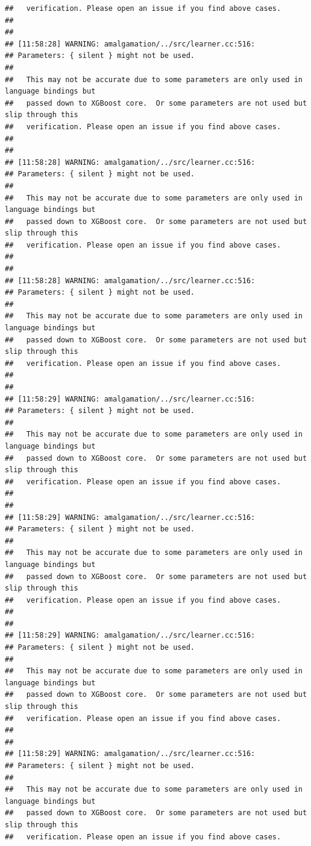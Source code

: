 \documentclass[AMS,STIX2COL]{WileyNJD-v2}\usepackage[]{graphicx}\usepackage[]{color}
\makeatletter
\newenvironment{kframe}{%
 \def\at@end@of@kframe{}%
 \ifinner\ifhmode%
  \def\at@end@of@kframe{\end{minipage}}%
  \begin{minipage}{\columnwidth}%
 \fi\fi%
 \def\FrameCommand##1{\hskip\@totalleftmargin \hskip-\fboxsep
 \colorbox{shadecolor}{##1}\hskip-\fboxsep
     \hskip-\linewidth \hskip-\@totalleftmargin \hskip\columnwidth}%
 \MakeFramed {\advance\hsize-\width
   \@totalleftmargin\z@ \linewidth\hsize
   \@setminipage}}%
 {\par\unskip\endMakeFramed%
 \at@end@of@kframe}
\newenvironment{knitrout}{}{} %
\makeatother
\begin{document}
\begin{knitrout}
\begin{kframe}
\begin{verbatim}
##   verification. Please open an issue if you find above cases.
## 
## 
## [11:58:28] WARNING: amalgamation/../src/learner.cc:516: 
## Parameters: { silent } might not be used.
## 
##   This may not be accurate due to some parameters are only used in language bindings but
##   passed down to XGBoost core.  Or some parameters are not used but slip through this
##   verification. Please open an issue if you find above cases.
## 
## 
## [11:58:28] WARNING: amalgamation/../src/learner.cc:516: 
## Parameters: { silent } might not be used.
## 
##   This may not be accurate due to some parameters are only used in language bindings but
##   passed down to XGBoost core.  Or some parameters are not used but slip through this
##   verification. Please open an issue if you find above cases.
## 
## 
## [11:58:28] WARNING: amalgamation/../src/learner.cc:516: 
## Parameters: { silent } might not be used.
## 
##   This may not be accurate due to some parameters are only used in language bindings but
##   passed down to XGBoost core.  Or some parameters are not used but slip through this
##   verification. Please open an issue if you find above cases.
## 
## 
## [11:58:29] WARNING: amalgamation/../src/learner.cc:516: 
## Parameters: { silent } might not be used.
## 
##   This may not be accurate due to some parameters are only used in language bindings but
##   passed down to XGBoost core.  Or some parameters are not used but slip through this
##   verification. Please open an issue if you find above cases.
## 
## 
## [11:58:29] WARNING: amalgamation/../src/learner.cc:516: 
## Parameters: { silent } might not be used.
## 
##   This may not be accurate due to some parameters are only used in language bindings but
##   passed down to XGBoost core.  Or some parameters are not used but slip through this
##   verification. Please open an issue if you find above cases.
## 
## 
## [11:58:29] WARNING: amalgamation/../src/learner.cc:516: 
## Parameters: { silent } might not be used.
## 
##   This may not be accurate due to some parameters are only used in language bindings but
##   passed down to XGBoost core.  Or some parameters are not used but slip through this
##   verification. Please open an issue if you find above cases.
## 
## 
## [11:58:29] WARNING: amalgamation/../src/learner.cc:516: 
## Parameters: { silent } might not be used.
## 
##   This may not be accurate due to some parameters are only used in language bindings but
##   passed down to XGBoost core.  Or some parameters are not used but slip through this
##   verification. Please open an issue if you find above cases.

\end{verbatim}
\end{kframe}
\end{knitrout}
\end{document}
